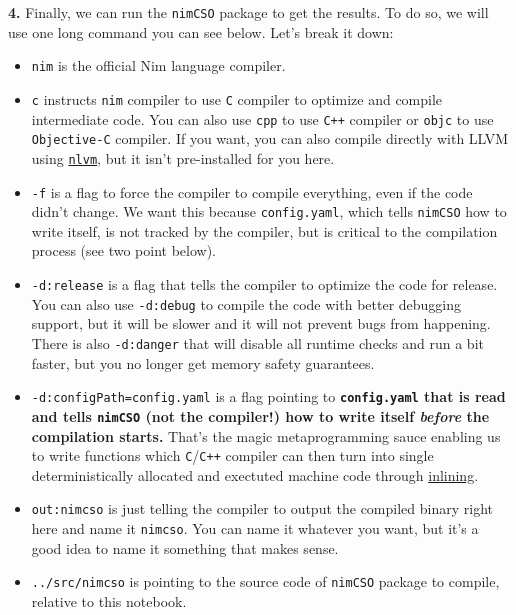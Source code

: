 \textbf{4.} Finally, we can run the \texttt{nimCSO}
package to get the results. To do so, we will use one long command you
can see below. Let's break it down:

\begin{itemize}
\item
  \texttt{nim} is the official Nim language compiler.
\item
  \texttt{c} instructs \texttt{nim}
  compiler to use \texttt{C} compiler to optimize and
  compile intermediate code. You can also use
  \texttt{cpp} to use \texttt{C++}
  compiler or \texttt{objc} to use
  \texttt{Objective-C} compiler. If you want, you can
  also compile directly with LLVM using
  \href{https://github.com/arnetheduck/nlvm}{\texttt{nlvm}},
  but it isn't pre-installed for you here.
\item
  \texttt{-f} is a flag to force the compiler to
  compile everything, even if the code didn't change. We want this
  because \texttt{config.yaml}, which tells
  \texttt{nimCSO} how to write itself, is not tracked
  by the compiler, but is critical to the compilation process (see two
  point below).
\item
  \texttt{-d:release} is a flag that tells the compiler
  to optimize the code for release. You can also use
  \texttt{-d:debug} to compile the code with better
  debugging support, but it will be slower and it will not prevent bugs
  from happening. There is also \texttt{-d:danger} that
  will disable all runtime checks and run a bit faster, but you no
  longer get memory safety guarantees.
\item
  \texttt{-d:configPath=config.yaml} is a flag pointing
  to \textbf{\texttt{config.yaml} that is read and
  tells \texttt{nimCSO} (not the compiler!) how to
  write itself \emph{before} the compilation starts.} That's the magic
  metaprogramming sauce enabling us to write functions which
  \texttt{C}/\texttt{C++} compiler can
  then turn into single deterministically allocated and exectuted
  machine code through
  \href{https://en.wikipedia.org/wiki/Inline_expansion}{inlining}.
\item
  \texttt{out:nimcso} is just telling the compiler to
  output the compiled binary right here and name it
  \texttt{nimcso}. You can name it whatever you want,
  but it's a good idea to name it something that makes sense.
\item
  \texttt{../src/nimcso} is pointing to the source code
  of \texttt{nimCSO} package to compile, relative to
  this notebook.
\end{itemize}

